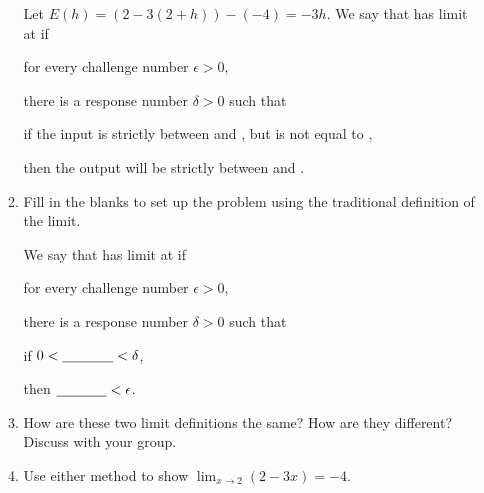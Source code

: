 \documentclass{article}
\newcommand{\D}{\displaystyle}
\begin{document}
\begin{enumerate}
\begin{enumerate}
	Let $E(h)=(2-3(2+h))-(-4)=-3h$. We say that \underline{\hspace{0.5in}} has limit \underline{\hspace{0.5in}} at \underline{\hspace{0.5in}} if
	
	\hspace{0.5cm} for every challenge number $\epsilon > 0$,
	
	\hspace{1cm} there is a response number $\delta > 0$ such that
	
	\hspace{1.5cm} if the input \underline{\hspace{0.75cm}} is strictly between \underline{\hspace{0.75cm}} and \underline{\hspace{0.75cm}}, but \underline{\hspace{0.75cm}} is not equal to \underline{\hspace{0.75cm}},
	
	\hspace{2cm} then the output \underline{\hspace{0.5in}} will be strictly between \underline{\hspace{0.5in}} and \underline{\hspace{0.5in}}.
	
	\item Fill in the blanks to set up the problem using the traditional definition of the limit.
	
	We say that \underline{\hspace{0.5in}} has limit \underline{\hspace{0.5in}} at \underline{\hspace{0.5in}} if
	
	\hspace{0.5cm} for every challenge number $\epsilon > 0$,
	
	\hspace{1cm} there is a response number $\delta > 0$ such that
	
	\hspace{1.5cm} if $0 < \underline{\hspace{0.5in}} < \delta $,
	
	\hspace{2cm} then $\underline{\hspace{0.5in}} < \epsilon$.
	
	\item How are these two limit definitions the same? How are they different? Discuss with your group.
	\vspace{1in}
	\item Use either method to show $\D \lim_{x \to 2} (2-3x) = -4$.
	\vskip 4cm
\end{enumerate}


\end{enumerate}
\end{document}
